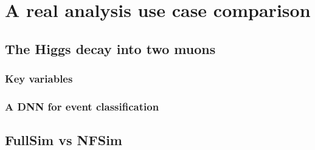 \chapter{A real analysis use case comparison}\label{ch:benan} %

\section{The Higgs decay into two muons}

\subsection{Key variables}

\subsection{A DNN for event classification}

\section{FullSim vs NFSim}

